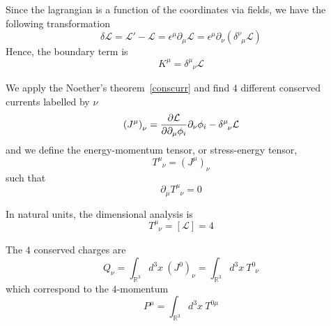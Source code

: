     Since the lagrangian is a function of the coordinates via fields, we have the following transformation
    \begin{equation*}
        \delta \mathcal L = \mathcal L' - \mathcal L = \epsilon^\mu \partial_\mu \mathcal L = \epsilon^\mu \partial_\nu(\delta^\nu_{\phantom \nu \mu} \mathcal L)
    \end{equation*}
    Hence, the boundary term is 
    \begin{equation*}
        K^\mu = \delta^\mu_{\phantom \mu \nu} \mathcal L
    \end{equation*}

    We apply the Noether's theorem~\eqref{conscurr} and find $4$ different conserved currents labelled by $\nu$
    \begin{equation*}
        {(J^\mu)}_\nu = \pdv{\mathcal L}{\partial_\mu \phi_i} \partial_\nu \phi_i - \delta^\mu_{\phantom \mu \nu} \mathcal L
    \end{equation*}
    and we define the energy-momentum tensor, or stress-energy tensor, 
    \begin{equation*}\label{emten}
        T^\mu_{\phantom \mu \nu} = {(J^\mu)}_\nu
    \end{equation*}
    such that 
    \begin{equation*}
        \partial_\mu T^\mu_{\phantom \mu \nu} = 0
    \end{equation*}

    In natural units, the dimensional analysis is 
    \begin{equation*}
        T^\mu_{\phantom \mu \nu} = [\mathcal L] = 4
    \end{equation*}

    The $4$ conserved charges are 
    \begin{equation*}
        Q_\nu = \int_{\mathbb R^3} d^3 x ~ (J^0)_\nu = \int_{\mathbb R^3} d^3 x ~ T^0_{\phantom 0 \nu} 
    \end{equation*}
    which correspond to the $4$-momentum
    \begin{equation*}
        P^\mu = \int_{\mathbb R^3} d^3 x ~ T^{0\mu}
    \end{equation*}

